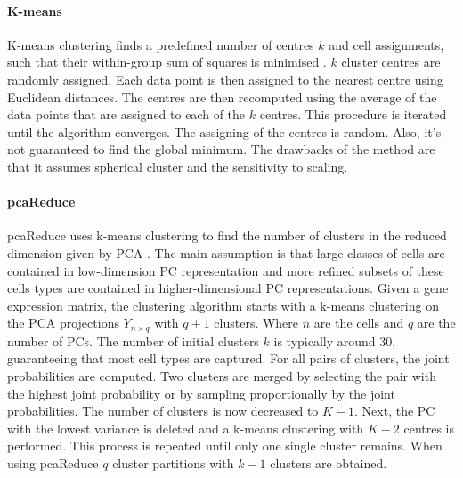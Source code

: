 \documentclass[11pt, a4paper]{article}\usepackage[]{graphicx}\usepackage[]{color}
\begin{document}
\paragraph{K-means}
K-means clustering finds a predefined number of centres $k$ and cell assignments, such that their within-group sum of squares is minimised \citep{hartigan1979algorithm}. $k$ cluster centres are randomly assigned.
Each data point is then assigned to the nearest centre using Euclidean distances. The centres are then recomputed using the average of the data points that are assigned to each of the $k$ centres. This procedure is iterated until the algorithm converges. The assigning of the centres is random. Also, it's not guaranteed to find the global minimum.  The drawbacks of the method are that it assumes spherical cluster and the sensitivity to scaling. 
\paragraph{pcaReduce}
pcaReduce uses k-means clustering to find the number of clusters in the reduced dimension given by PCA \citep{yau2016pcareduce}. The main assumption is that large classes of cells are contained in low-dimension PC representation and more refined subsets of these cells types are contained in higher-dimensional PC representations. Given a gene expression matrix, the clustering algorithm starts with a k-means clustering on the PCA projections $Y_{n\times q}$ with $q+1$ clusters. Where $n$ are the cells and $q$ are the number of PCs. The number of initial clusters $k$ is typically around 30,  guaranteeing that most cell types are captured. For all pairs of clusters, the joint probabilities are computed. Two clusters are merged by selecting the pair with the highest joint probability or by sampling proportionally by the joint probabilities. The number of clusters is now decreased to $K-1$. Next, the PC with the lowest variance is deleted and a k-means clustering with $K-2$ centres is performed. This process is repeated until only one single cluster remains. When using pcaReduce $q$ cluster partitions with $k-1$ clusters are obtained.
\end{document}
